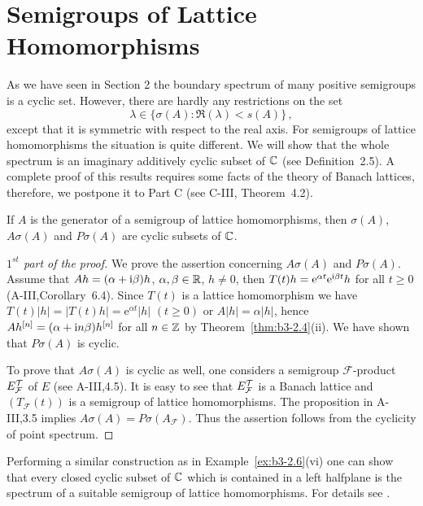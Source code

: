 \section{Semigroups of Lattice Homomorphisms}%
As we have seen in Section 2 the boundary spectrum of many positive semigroups is a cyclic set.
However, there are hardly any restrictions on the set 
\[
\lambda \in \{ \sigma(A) \colon \Re(\lambda) < s(A)\}\,,
\] 
except that it is symmetric with respect to the real axis.
For semigroups of lattice homomorphisms the situation is quite different.
We will show that the whole spectrum is an imaginary additively cyclic subset of $\mathbb{C}$ (see Definition~2.5).
A complete proof of this results requires some facts of the theory of Banach lattices, therefore, we postpone it to Part C (see C-III, Theorem~4.2).
\begin{theorem}\label{thm:b3-4.1}
%
	If $A$ is the generator of a semigroup of lattice homomorphisms, then $\sigma(A)$, $A\sigma(A)$ and $P\sigma(A)$ are cyclic subsets of $\mathbb{C}$.
\end{theorem}
\begin{proof}[$1^{st}$ part of the proof]
	We prove the assertion concerning $A\sigma(A)$ and $P\sigma(A)$.
	Assume that $Ah = (\alpha + \mathrm{i}\beta)h$, $\alpha,\beta \in \mathbb{R}$, $h \neq 0$, then $T(t)h = \mathrm{e}^{\alpha t}\mathrm{e}^{\mathrm{i}\beta  t}h$ for all $t \geq 0$ (A-III,Corollary~6.4).
	Since $T(t)$ is a lattice homomorphism we have $T(t)|h| = |T(t)h| = \mathrm{e}^{\alpha t}|h|$ $(t \geq 0)$ or $A|h| = \alpha|h|$, hence $Ah^{[n]} = (\alpha + \mathrm{i} n\beta)h^{[n]}$ for all $n \in \mathbb{Z}$ by Theorem~\ref{thm:b3-2.4}(ii).
	We have shown that $P\sigma(A)$ is cyclic.
	
	To prove that $A\sigma(A)$ is cyclic as well, one considers a semigroup $\mathcal{F}$-product $E_{\mathcal{F}}^{\mathcal{T}}$ of $E$ (see A-III,4.5).
	It is easy to see that $E_{\mathcal{F}}^{\mathcal{T}}$ is a Banach lattice 
	and $(T_{\mathcal{F}}(t))$ is a semigroup of lattice homomorphisms.
	The proposition in A-III,3.5 implies $A\sigma(A) = P\sigma(A_{\mathcal{F}})$.
	Thus the assertion follows from the cyclicity of point spectrum.
\end{proof}
Performing a similar construction as in Example~\ref{ex:b3-2.6}(vi) one can show that every closed cyclic subset of $\mathbb{C}$  which is contained in a left halfplane is the spectrum of a suitable semigroup of lattice homomorphisms. 
For details see \citet{derndingernagel:1979}. 
